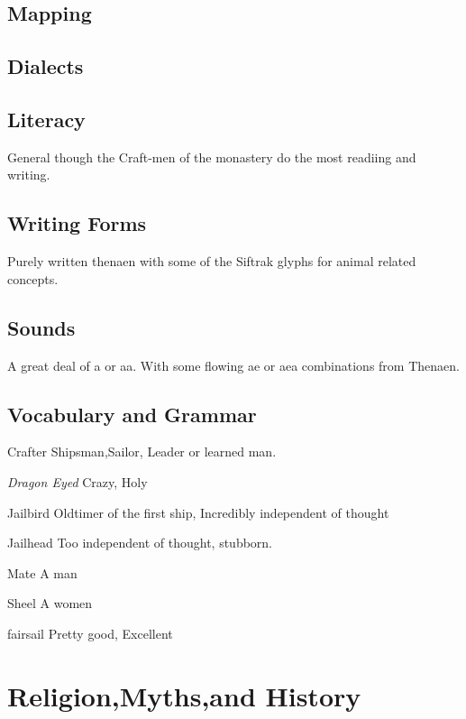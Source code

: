 \subsection{Mapping}
\subsection{Dialects}
\subsection{Literacy}

General though the Craft-men of the monastery do the most readiing
and writing.

\subsection{Writing Forms}

Purely written thenaen with some of the Siftrak glyphs for animal
related concepts.

\subsection{Sounds}

A great deal of a or aa. With some flowing ae or aea combinations
from Thenaen.

\subsection{Vocabulary and Grammar}

\begin{relate}
        \item[Crafter]  Shipsman,Sailor, Leader or learned man.
        \item[{\it Dragon Eyed}] Crazy, Holy
        \item[Jailbird] Oldtimer of the first ship, Incredibly independent
        of thought
        \item[Jailhead] Too independent of thought, stubborn.
        \item[Mate] A man
        \item[Sheel] A women
        \item[fairsail] Pretty good, Excellent
\end{relate}

\section{Religion,Myths,and History}

